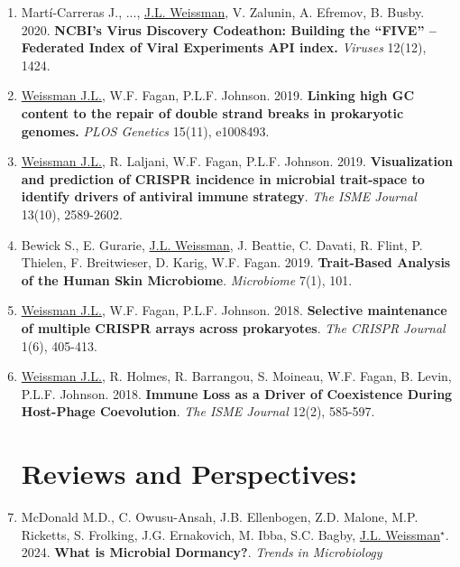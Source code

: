 \documentclass[]{res}
\begin{document}
\begin{resume}
\begin{enumerate}
\item Mart\'{i}-Carreras J., ..., \underline{J.L. Weissman}, V. Zalunin, A. Efremov, B. Busby. 2020. {\bf NCBI’s Virus Discovery Codeathon: Building the “FIVE” -- Federated Index of Viral Experiments API index.} \emph{Viruses} 12(12), 1424.
 
 \item \underline{Weissman J.L.}, W.F. Fagan, P.L.F. Johnson. 2019. {\bf Linking high GC content to the repair of double strand breaks in prokaryotic genomes.} \emph{PLOS Genetics} 15(11), e1008493. %
 
 \item \underline{Weissman J.L.}, R. Laljani, W.F. Fagan, P.L.F. Johnson. 2019. {\bf Visualization and prediction of CRISPR incidence in microbial trait-space to identify drivers of antiviral immune strategy}. \emph{The ISME Journal} 13(10), 2589-2602. %
 
 \item Bewick S., E. Gurarie, \underline{J.L. Weissman}, J. Beattie, C. Davati, R. Flint, P. Thielen, F. Breitwieser, D. Karig, W.F. Fagan. 2019. {\bf Trait-Based Analysis of the Human Skin Microbiome}. \emph{Microbiome} 7(1), 101.  %

 \item \underline{Weissman J.L.}, W.F. Fagan, P.L.F. Johnson. 2018. {\bf Selective maintenance of multiple CRISPR arrays across prokaryotes}. \emph{The CRISPR Journal} 1(6), 405-413. %
 

\item \underline{Weissman J.L.}, R. Holmes, R. Barrangou, S. Moineau, W.F. Fagan, B. Levin, P.L.F. Johnson. 2018. {\bf Immune Loss as a Driver of Coexistence During Host-Phage Coevolution}. \emph{The ISME Journal} 12(2), 585-597. %
 
\section{Reviews and Perspectives:} \vspace{0mm}

\item McDonald M.D., C. Owusu-Ansah, J.B. Ellenbogen, Z.D. Malone, M.P. Ricketts, S. Frolking, J.G. Ernakovich, M. Ibba, S.C. Bagby, \underline{J.L. Weissman$^\star$}. 2024. {\bf What is Microbial Dormancy?}. \emph{Trends in Microbiology}


\end{enumerate}
\end{resume}
\end{document}
